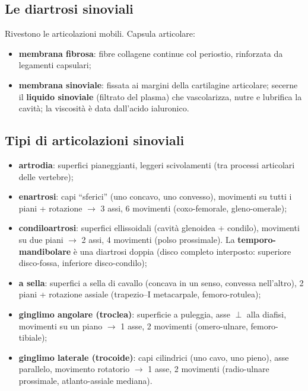 \subsection{Le diartrosi sinoviali}
Rivestono le articolazioni mobili. Capsula articolare:
\begin{itemize}
  \item \textbf{membrana fibrosa}: fibre collagene continue col periostio, rinforzata da legamenti
    capsulari;
  \item \textbf{membrana sinoviale}: fissata ai margini della cartilagine articolare; secerne il
    \textbf{liquido sinoviale} (filtrato del plasma) che vascolarizza, nutre e lubrifica la cavità;
    la viscosità è data dall'acido ialuronico.
\end{itemize}

\subsection{Tipi di articolazioni sinoviali}
\begin{itemize}
  \item \textbf{artrodia}: superfici pianeggianti, leggeri scivolamenti (tra processi articolari
    delle vertebre);
  \item \textbf{enartrosi}: capi ``sferici'' (uno concavo, uno convesso), movimenti su tutti i
    piani + rotazione $\rightarrow$ 3 assi, 6 movimenti (coxo-femorale, gleno-omerale);
  \item \textbf{condiloartrosi}: superfici ellissoidali (cavità glenoidea + condilo), movimenti su
    due piani $\rightarrow$ 2 assi, 4 movimenti (polso prossimale). La \textbf{temporo-mandibolare}
    è una diartrosi doppia (disco completo interposto: superiore disco-fossa, inferiore
    disco-condilo);
  \item \textbf{a sella}: superfici a sella di cavallo (concava in un senso, convessa nell'altro),
    2 piani + rotazione assiale (trapezio--I metacarpale, femoro-rotulea);
  \item \textbf{ginglimo angolare (troclea)}: superficie a puleggia, asse $\perp$ alla diafisi,
    movimenti su un piano $\rightarrow$ 1 asse, 2 movimenti (omero-ulnare, femoro-tibiale);
  \item \textbf{ginglimo laterale (trocoide)}: capi cilindrici (uno cavo, uno pieno), asse
    parallelo, movimento rotatorio $\rightarrow$ 1 asse, 2 movimenti (radio-ulnare prossimale,
    atlanto-assiale mediana).
\end{itemize}

